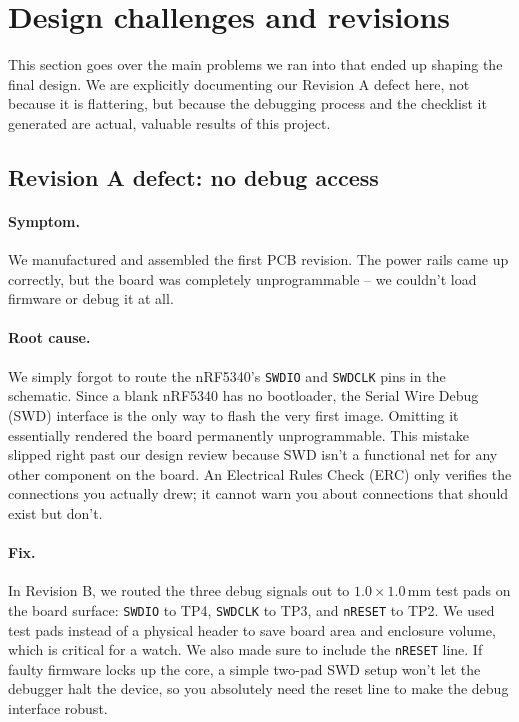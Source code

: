 \documentclass[12pt, a4paper]{article}
\begin{document}
\section{Design challenges and revisions}
\label{sec:challenges}

This section goes over the main problems we ran into that ended up shaping the final design. We are explicitly documenting our Revision A defect here, not because it is flattering, but because the debugging process and the checklist it generated are actual, valuable results of this project.

\subsection{Revision A defect: no debug access}

\paragraph{Symptom.} We manufactured and assembled the first PCB revision. The power rails came up correctly, but the board was completely unprogrammable -- we couldn't load firmware or debug it at all.

\paragraph{Root cause.} We simply forgot to route the nRF5340's \texttt{SWDIO} and \texttt{SWDCLK} pins in the schematic. Since a blank nRF5340 has no bootloader, the Serial Wire Debug (SWD) interface is the only way to flash the very first image. Omitting it essentially rendered the board permanently unprogrammable. This mistake slipped right past our design review because SWD isn't a functional net for any other component on the board. An Electrical Rules Check (ERC) only verifies the connections you actually drew; it cannot warn you about connections that should exist but don't.

\paragraph{Fix.} In Revision B, we routed the three debug signals out to $1.0\times1.0\,\text{mm}$ test pads on the board surface: \texttt{SWDIO} to TP4, \texttt{SWDCLK} to TP3, and \texttt{nRESET} to TP2. We used test pads instead of a physical header to save board area and enclosure volume, which is critical for a watch. We also made sure to include the \texttt{nRESET} line. If faulty firmware locks up the core, a simple two-pad SWD setup won't let the debugger halt the device, so you absolutely need the reset line to make the debug interface robust.
\end{document}
